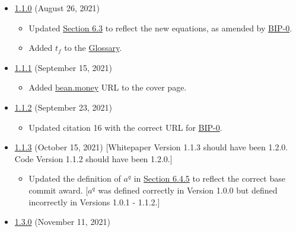 \documentclass[class=article, crop=false]{standalone}
\begin{document}
\begin{itemize}[topsep=0pt, itemsep=3pt,leftmargin=16pt]
    \item \href{https://github.com/BeanstalkFarms/Beanstalk-Whitepaper/blob/master/version-history/beanstalk1_1_0.pdf}{1.1.0} (August 26, 2021)
    
    \begin{itemize}
        \item Updated \hyperlink{subsection.6.3}{Section 6.3} to reflect the new  equations, as amended by \href{https://bean.money/bip-0}{BIP-0}.
        \item Added $t_f$ to the \hyperlink{subsection.14.11}{Glossary}.
    \end{itemize}
    
    \item \href{https://github.com/BeanstalkFarms/Beanstalk-Whitepaper/blob/master/version-history/beanstalk1_1_1.pdf}{1.1.1} (September 15, 2021)
    
    \begin{itemize}
        \item Added \href{https://bean.money/}{bean.money} URL to the cover page.
    \end{itemize}
    
    \item \href{https://github.com/BeanstalkFarms/Beanstalk-Whitepaper/blob/master/version-history/beanstalk1_1_2.pdf}{1.1.2} (September 23, 2021)
    
    \begin{itemize}
        \item Updated citation 16 with the correct URL for \href{https://bean.money/bip-0}{BIP-0}.
    \end{itemize}
    
    \item \href{https://github.com/BeanstalkFarms/Beanstalk-Whitepaper/blob/master/version-history/beanstalk1_1_3.pdf}{1.1.3} (October 15, 2021) [Whitepaper Version 1.1.3 should have been 1.2.0. Code Version 1.1.2 should have been 1.2.0.]
    
    \begin{itemize}
        \item Updated the definition of $a^q$ in \hyperlink{subsubsection.6.4.5}{Section 6.4.5} to reflect the correct base commit award. [$a^q$ was defined correctly in Version 1.0.0 but defined incorrectly in Versions 1.0.1 - 1.1.2.]
    \end{itemize}
    
    \item \href{https://github.com/BeanstalkFarms/Beanstalk-Whitepaper/blob/master/version-history/beanstalk1_3_0.pdf}{1.3.0} (November 11, 2021)
    

\end{itemize}
\end{document}
